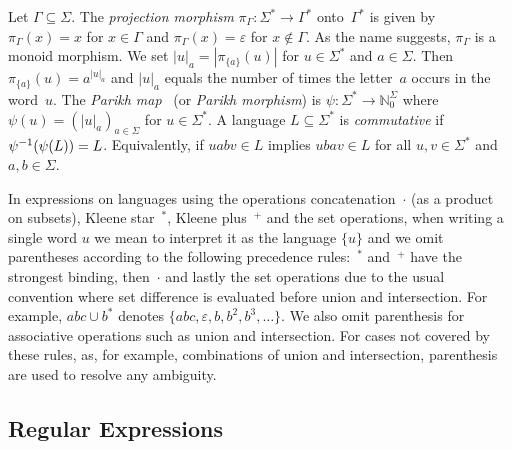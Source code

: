 \label{def:projection}
\label{def:Parikhmap}
\label{def:occurrences_of_letters}
Let $\Gamma \subseteq \Sigma$. The
\emph{projection morphism} $\pi_{\Gamma} \colon \Sigma^* \to \Gamma^*$ onto~$\Gamma^*$
is given 
by
$\pi_{\Gamma}(x) = x$ for $x \in \Gamma$ and 
$\pi_{\Gamma}(x) = \varepsilon$
for $x \notin \Gamma$. As the name suggests, $\pi_{\Gamma}$ is a monoid morphism.
We set $|u|_a = |\pi_{\{a\}}(u)|$ for $u \in \Sigma^*$ and $a \in \Sigma$. Then $\pi_{\{a\}}(u) = a^{|u|_a}$
and $|u|_a$
equals the number of times the letter~$a$ occurs in the word~$u$. 
The \emph{Parikh map}~\cite{DBLP:journals/jacm/Parikh66} 
(or \emph{Parikh morphism}) 
is $\psi \colon \Sigma^* \to \mathbb N_0^{\Sigma}$ 
where $\psi(u) = (|u|_a)_{a \in \Sigma}$
for $u \in \Sigma^*$.
A language $L \subseteq \Sigma^*$ 
is \emph{commutative} if $\applyfunc{\applyfunc{L}{\psi}}{\psi^{-1}} = L$.
Equivalently, if $uabv \in L$
implies $ubav \in L$ for all $u,v \in \Sigma^*$
and $a,b\in \Sigma$.  

In expressions on languages using the operations concatenation~$\cdot$ (as a product on subsets), 
Kleene star~$^*$, Kleene plus~$^+$
and the set operations, when writing a single word $u$ we mean 
to interpret it as the language $\{u\}$
and we omit parentheses according to the following precedence rules:~$^*$ and~$^+$
have the strongest binding, then~$\cdot$ and lastly the set operations
due to the usual convention where set difference is evaluated before union and intersection.
For example, $abc \cup b^*$ denotes $\{abc,\varepsilon,b,b^2,b^3,\ldots\}$.
We also omit parenthesis for associative operations such as union and intersection.
For cases not covered by these rules, as, for example, combinations of union and intersection,
parenthesis are used to resolve any ambiguity.

\subsection{Regular Expressions}
\label{prelim:sec:regex} 


